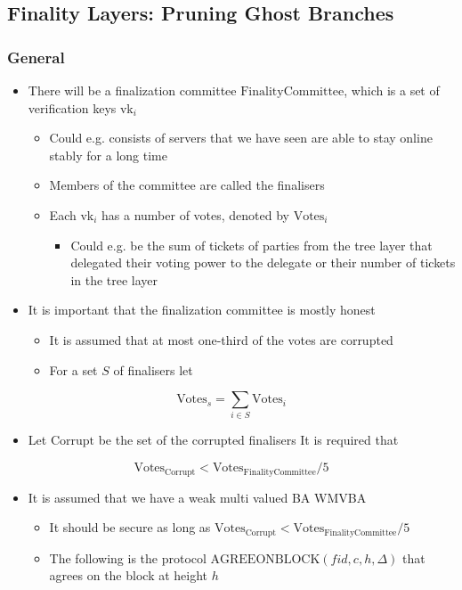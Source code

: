 \documentclass[11pt]{article}
\begin{document}
\subsection{Finality Layers: Pruning Ghost Branches}
\label{sec:orgb451027}
\subsubsection{General}
\label{sec:org59db1d7}
\begin{itemize}
\item There will be a finalization committee \(\text{FinalityCommittee}\), which is a set of verification keys \(\text{vk}_i\)
\begin{itemize}
\item Could e.g. consists of servers that we have seen are able to stay online stably for a long time
\item Members of the committee are called the finalisers
\item Each \(\text{vk}_i\) has a number of votes, denoted by \(\text{Votes}_i\)
\begin{itemize}
\item Could e.g. be the sum of tickets of parties from the tree layer that delegated their voting power to the delegate or their number of tickets in the tree layer
\end{itemize}
\end{itemize}

\item It is important that the finalization committee is mostly honest
\begin{itemize}
\item It is assumed that at most one-third of the votes are corrupted
\item For a set \(S\) of finalisers let
\end{itemize}
\end{itemize}
\begin{equation}
  \text{Votes}_s = \sum_{i \in S} \text{Votes}_i
\end{equation}
\begin{itemize}
\item Let \(\text{Corrupt}\) be the set of the corrupted finalisers It is required that
\end{itemize}
\begin{equation}
  \text{Votes}_\text{Corrupt} < \text{Votes}_\text{FinalityCommittee}/5
\end{equation}
\begin{itemize}
\item It is assumed that we have a weak multi valued BA WMVBA
\begin{itemize}
\item It should be secure as long as \(\text{Votes}_\text{Corrupt} < \text{Votes}_\text{FinalityCommittee}/5\)
\item The following is the protocol \(\text{AGREEONBLOCK}(fid,c,h, \Delta)\) that agrees on the block at height \(h\)
\end{itemize}
\end{itemize}
\end{document}
